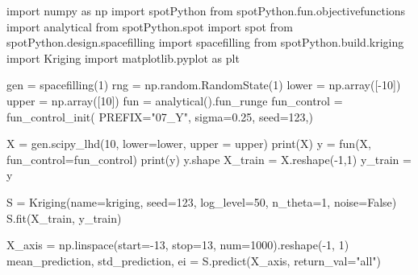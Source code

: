 \documentclass[
  letterpaper,
  DIV=11,
  numbers=noendperiod]{scrreprt}
\newenvironment{Shaded}{\begin{snugshade}}{\end{snugshade}}
\newcommand{\BuiltInTok}[1]{\textcolor[rgb]{0.00,0.23,0.31}{#1}}
\newcommand{\DecValTok}[1]{\textcolor[rgb]{0.68,0.00,0.00}{#1}}
\newcommand{\FloatTok}[1]{\textcolor[rgb]{0.68,0.00,0.00}{#1}}
\newcommand{\ImportTok}[1]{\textcolor[rgb]{0.00,0.46,0.62}{#1}}
\newcommand{\NormalTok}[1]{\textcolor[rgb]{0.00,0.23,0.31}{#1}}
\newcommand{\OperatorTok}[1]{\textcolor[rgb]{0.37,0.37,0.37}{#1}}
\newcommand{\StringTok}[1]{\textcolor[rgb]{0.13,0.47,0.30}{#1}}
\newcommand{\VariableTok}[1]{\textcolor[rgb]{0.07,0.07,0.07}{#1}}
\begin{document}
\begin{Shaded}
\begin{Highlighting}[]
\ImportTok{import}\NormalTok{ numpy }\ImportTok{as}\NormalTok{ np}
\ImportTok{import}\NormalTok{ spotPython}
\ImportTok{from}\NormalTok{ spotPython.fun.objectivefunctions }\ImportTok{import}\NormalTok{ analytical}
\ImportTok{from}\NormalTok{ spotPython.spot }\ImportTok{import}\NormalTok{ spot}
\ImportTok{from}\NormalTok{ spotPython.design.spacefilling }\ImportTok{import}\NormalTok{ spacefilling}
\ImportTok{from}\NormalTok{ spotPython.build.kriging }\ImportTok{import}\NormalTok{ Kriging}
\ImportTok{import}\NormalTok{ matplotlib.pyplot }\ImportTok{as}\NormalTok{ plt}

\NormalTok{gen }\OperatorTok{=}\NormalTok{ spacefilling(}\DecValTok{1}\NormalTok{)}
\NormalTok{rng }\OperatorTok{=}\NormalTok{ np.random.RandomState(}\DecValTok{1}\NormalTok{)}
\NormalTok{lower }\OperatorTok{=}\NormalTok{ np.array([}\OperatorTok{{-}}\DecValTok{10}\NormalTok{])}
\NormalTok{upper }\OperatorTok{=}\NormalTok{ np.array([}\DecValTok{10}\NormalTok{])}
\NormalTok{fun }\OperatorTok{=}\NormalTok{ analytical().fun\_runge}
\NormalTok{fun\_control }\OperatorTok{=}\NormalTok{ fun\_control\_init(}
\NormalTok{    PREFIX}\OperatorTok{=}\StringTok{"07\_Y"}\NormalTok{,}
\NormalTok{    sigma}\OperatorTok{=}\FloatTok{0.25}\NormalTok{,}
\NormalTok{    seed}\OperatorTok{=}\DecValTok{123}\NormalTok{,)}

\NormalTok{X }\OperatorTok{=}\NormalTok{ gen.scipy\_lhd(}\DecValTok{10}\NormalTok{, lower}\OperatorTok{=}\NormalTok{lower, upper }\OperatorTok{=}\NormalTok{ upper)}
\BuiltInTok{print}\NormalTok{(X)}
\NormalTok{y }\OperatorTok{=}\NormalTok{ fun(X, fun\_control}\OperatorTok{=}\NormalTok{fun\_control)}
\BuiltInTok{print}\NormalTok{(y)}
\NormalTok{y.shape}
\NormalTok{X\_train }\OperatorTok{=}\NormalTok{ X.reshape(}\OperatorTok{{-}}\DecValTok{1}\NormalTok{,}\DecValTok{1}\NormalTok{)}
\NormalTok{y\_train }\OperatorTok{=}\NormalTok{ y}

\NormalTok{S }\OperatorTok{=}\NormalTok{ Kriging(name}\OperatorTok{=}\StringTok{\textquotesingle{}kriging\textquotesingle{}}\NormalTok{,  seed}\OperatorTok{=}\DecValTok{123}\NormalTok{, log\_level}\OperatorTok{=}\DecValTok{50}\NormalTok{, n\_theta}\OperatorTok{=}\DecValTok{1}\NormalTok{, noise}\OperatorTok{=}\VariableTok{False}\NormalTok{)}
\NormalTok{S.fit(X\_train, y\_train)}

\NormalTok{X\_axis }\OperatorTok{=}\NormalTok{ np.linspace(start}\OperatorTok{={-}}\DecValTok{13}\NormalTok{, stop}\OperatorTok{=}\DecValTok{13}\NormalTok{, num}\OperatorTok{=}\DecValTok{1000}\NormalTok{).reshape(}\OperatorTok{{-}}\DecValTok{1}\NormalTok{, }\DecValTok{1}\NormalTok{)}
\NormalTok{mean\_prediction, std\_prediction, ei }\OperatorTok{=}\NormalTok{ S.predict(X\_axis, return\_val}\OperatorTok{=}\StringTok{"all"}\NormalTok{)}


\end{Highlighting}
\end{Shaded}
\end{document}
